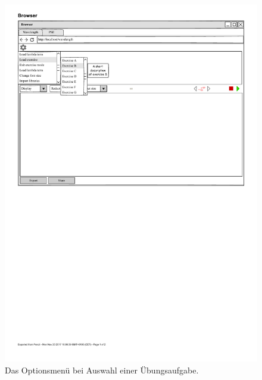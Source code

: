 \documentclass[parskip=full,11pt,twoside]{scrartcl}
\begin{document}
\begin{figure}[H]
	\centering
	\includegraphics[width=\textwidth]{img/wavelength_exercise_menu_open}
	\caption{Das Optionsmenü bei Auswahl einer Übungsaufgabe.}
\end{figure}
\end{document}
